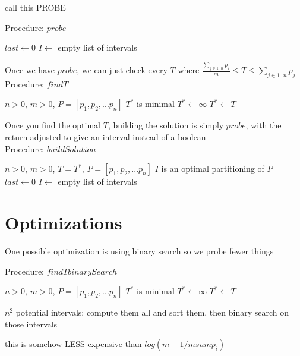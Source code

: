 \documentclass{article}
\begin{document}
call this PROBE


Procedure: $probe$

\begin{algorithm}
  $last \leftarrow 0$\;
  $I \leftarrow$ empty list of intervals\;
  \For{$i=1 \rightarrow m$}{
    find $j \ni \sum_{last \leq k < j} p_k \leq T$ and 
    $\sum_{last \leq k \leq j} p_k > T$ $I[i] 
    \leftarrow [last,j[$\;
    $last \leftarrow j$\;
  }
\end{algorithm}

Once we have $probe$, we can just check every $T$ where 
$\frac{\sum_{j \in 1..n} p_j}{m} \leq T \leq \sum_{j \in 1..n} p_j$
\\Procedure: $findT$
\begin{algorithmic}
  \REQUIRE $n > 0$, $m > 0$, $P = [p_1, p_2, ... p_n]$
  \ENSURE $T^*$ is minimal
  \STATE $T^* \leftarrow \infty$
      \STATE $T^* \leftarrow T$
    \ENDIF
  \ENDFOR
\end{algorithmic}

Once you find the optimal $T$, building the solution is simply $probe$, with
the return adjusted to give an interval instead of a boolean
\\Procedure: $buildSolution$
\begin{algorithmic}
  \REQUIRE $n > 0$, $m > 0$, $T = T^*$, $P = [p_1, p_2, ... p_n]$
  \ENSURE $I$ is an optimal partitioning of $P$
  \STATE $last \leftarrow 0$
  \STATE $I \leftarrow$ empty list of intervals

    \STATE{$I[i] \leftarrow [last,j[$}

  \ENDFOR
\end{algorithmic}

\section{Optimizations}
  One possible optimization is using binary search so we probe fewer things

  Procedure: $findTbinarySearch$
  \begin{algorithmic}
    \REQUIRE $n > 0$, $m > 0$, $P = [p_1, p_2, ... p_n]$
    \ENSURE $T^*$ is minimal
    \STATE $T^* \leftarrow \infty$
        \STATE $T^* \leftarrow T$
      \ENDIF
    \ENDFOR
  \end{algorithmic}

  $n^2$ potential intervals: compute them all and sort them, then binary search
  on those intervals
  
  this is somehow LESS expensive than $log(m-1/m sum p_i)$
\end{document}
